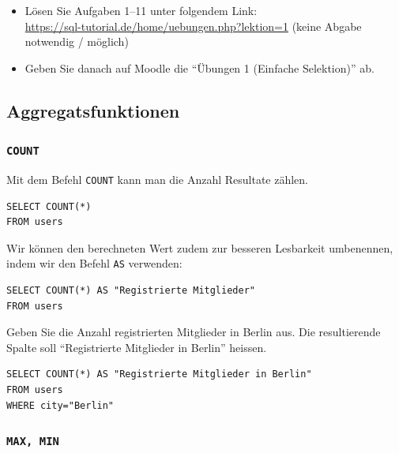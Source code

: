 \begin{mysubmission}
  \begin{itemize}
    \item Lösen Sie Aufgaben 1--11 unter folgendem Link:\\
\url{https://sql-tutorial.de/home/uebungen.php?lektion=1} (keine Abgabe notwendig / möglich)
    \item Geben Sie danach auf Moodle die ``Übungen 1 (Einfache Selektion)'' ab.
  \end{itemize}
\end{mysubmission}

\subsection{Aggregatsfunktionen}

\subsubsection{\texorpdfstring{\lstinline|COUNT|}{COUNT}}

Mit dem Befehl \lstinline|COUNT| kann man die Anzahl Resultate zählen.

\begin{lstlisting}
SELECT COUNT(*)
FROM users
\end{lstlisting}

Wir können den berechneten Wert zudem zur besseren Lesbarkeit umbenennen, indem wir den Befehl \lstinline|AS| verwenden:

\begin{lstlisting}
SELECT COUNT(*) AS "Registrierte Mitglieder" 
FROM users
\end{lstlisting}

\begin{myexercise}
  Geben Sie die Anzahl registrierten Mitglieder in Berlin aus. Die resultierende Spalte soll ``Registrierte Mitglieder in Berlin'' heissen.
  \begin{myanswer}
    \begin{lstlisting}
SELECT COUNT(*) AS "Registrierte Mitglieder in Berlin" 
FROM users
WHERE city="Berlin"
\end{lstlisting}
  \end{myanswer}
\end{myexercise}

\subsubsection{\texorpdfstring{\lstinline|MAX, MIN|}{MAX, MIN}}

